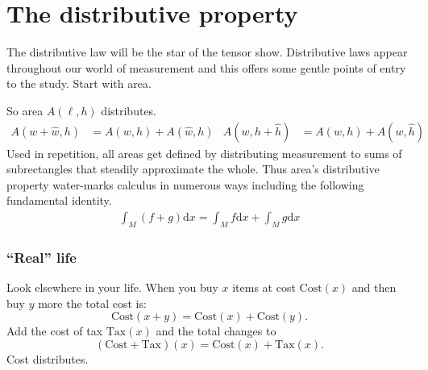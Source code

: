 
\chapter{The distributive property}

The distributive law will be the star of the tensor show.   Distributive laws
appear throughout our world of measurement and this offers some gentle points 
of entry to the study.  
Start with area.
\begin{center}
\hspace{1in}
\end{center}
So area $A(\ell,h)$ distributes.
\begin{align*}
    A(w+\hat{w},h) &= A(w,h)+A(\hat{w},h)
    &    A(w,h+\hat{h}) &= A(w,h)+A(w,\hat{h})
\end{align*}
Used in repetition, all areas get defined by distributing measurement to 
sums of subrectangles that steadily approximate the whole.
Thus area's distributive property water-marks calculus 
in numerous ways including the following fundamental identity.
\begin{align*}
    \int_M (f+g)\text{d}x = \int_M f \text{d}x + \int_M g \text{d}x
\end{align*}

\subsection{``Real'' life}
Look elsewhere in your life.  When you buy $x$ items at cost $\text{Cost}(x)$
and then buy $y$ more the total cost is:
\[
    \text{Cost}(x+y)=\text{Cost}(x)+\text{Cost}(y).
\]  
Add the cost of tax $\text{Tax}(x)$ and the total changes to 
\[
    (\text{Cost}+\text{Tax})(x)=\text{Cost}(x)+\text{Tax}(x).
\]
Cost distributes.  

